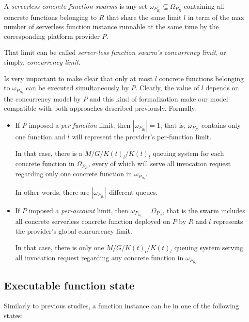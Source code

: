 \documentclass[10pt,a4paper]{report}
\theoremstyle{definition}
\begin{document}
A \textit{serverless concrete function swarms} is any set $\omega_{P_{R_l}} \subseteq \Omega_{P_R}$ containing all concrete functions belonging to $R$ that share the same limit $l$ in term of the max number of serverless function instance runnable at the same time by the corresponding platform provider $P$. 
	
That limit can be called \textit{server-less function swarm's concurrency limit}, or simply, \textit{concurrency limit}.
	
Is very important to make clear that only at most $l$ concrete functions belonging to $\omega_{P_{R_l}}$ can be executed simultaneously by $P$. Clearly, the value of $l$ depends on the concurrency model by $P$ and this kind of formalization make our model compatible with both approaches described previously. Formally:

\begin{itemize}
	
	\item If $P$ imposed a \textit{per-function} limit, then $|\omega_{P_{R_l}}| = 1$, that is, $\omega_{P_{R_l}}$ contains only one function and $l$ will represent the provider's per-function limit. 
	
	In that case, there is a $M/G/K(t)_{l}/K(t)_{l}$ queuing system for each concrete function in $\Omega_{P_R}$, every of which will serve all invocation request regarding only one concrete function in $\omega_{P_{R_l}}$.
	
	In other words, there are $|\omega_{P_{R_l}}|$ different queues.
	
	\item If $P$ imposed a \textit{per-account} limit, then $\omega_{P_{R_l}} = \Omega_{P_R}$, that is the swarm includes all concrete serverless concrete function deployed on $P$ by $R$ and $l$ represents the provider's global concurrency limit. 
	
	In that case, there is only one $M/G/K(t)_{l}/K(t)_{l}$ queuing system serving all invocation request regarding any concrete function in $\omega_{P_{R_l}}$.

\end{itemize}

\subsection{Executable function state}

Similarly to previous studies, a function instance can be in one of the following states: 
\end{document}

